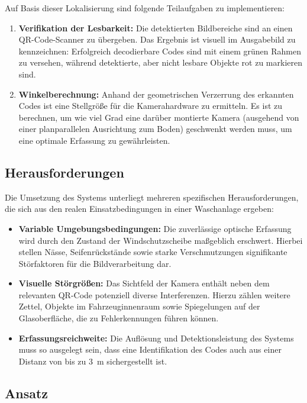 \documentclass[
    a4paper,        %
    11pt,           %
    ngerman,        %
    parskip=half,   %
    listof=totoc,   %
    bibliography=totoc %
]{scrartcl}
\begin{document}
Auf Basis dieser Lokalisierung sind folgende Teilaufgaben zu implementieren:
\begin{enumerate}
    \item \textbf{Verifikation der Lesbarkeit:} Die detektierten Bildbereiche sind an einen QR-Code-Scanner zu übergeben. Das Ergebnis ist visuell im Ausgabebild zu kennzeichnen: Erfolgreich decodierbare Codes sind mit einem grünen Rahmen zu versehen, während detektierte, aber nicht lesbare Objekte rot zu markieren sind.
    \item \textbf{Winkelberechnung:} Anhand der geometrischen Verzerrung des erkannten Codes ist eine Stellgröße für die Kamerahardware zu ermitteln. Es ist zu berechnen, um wie viel Grad eine darüber montierte Kamera (ausgehend von einer planparallelen Ausrichtung zum Boden) geschwenkt werden muss, um eine optimale Erfassung zu gewährleisten.
\end{enumerate}

\subsection{Herausforderungen}
Die Umsetzung des Systems unterliegt mehreren spezifischen Herausforderungen, die sich aus den realen Einsatzbedingungen in einer Waschanlage ergeben:

\begin{itemize}
    \item \textbf{Variable Umgebungsbedingungen:} Die zuverlässige optische Erfassung wird durch den Zustand der Windschutzscheibe maßgeblich erschwert. Hierbei stellen Nässe, Seifenrückstände sowie starke Verschmutzungen signifikante Störfaktoren für die Bildverarbeitung dar.
    \item \textbf{Visuelle Störgrößen:} Das Sichtfeld der Kamera enthält neben dem relevanten QR-Code potenziell diverse Interferenzen. Hierzu zählen weitere Zettel, Objekte im Fahrzeuginnenraum sowie Spiegelungen auf der Glasoberfläche, die zu Fehlerkennungen führen können.
    \item \textbf{Erfassungsreichweite:} Die Auflösung und Detektionsleistung des Systems muss so ausgelegt sein, dass eine Identifikation des Codes auch aus einer Distanz von bis zu \SI{3}{\meter} sichergestellt ist.
\end{itemize}

\subsection{Ansatz}
\end{document}
